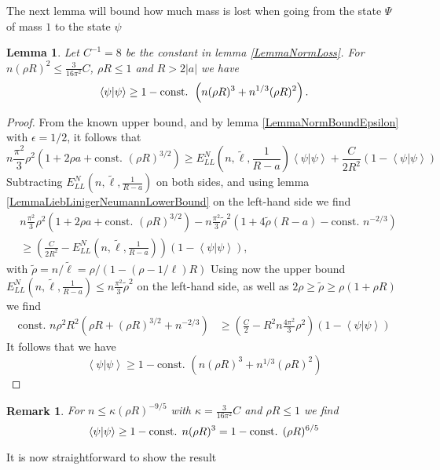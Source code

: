 \documentclass[a4paper,11pt]{article}
\newcommand{\abs}[1]{\left\lvert #1 \right\rvert}
\renewcommand{\braket}[1]{\left\langle#1\right\rangle}
\newtheorem{lemma}[theorem]{Lemma}
\newtheorem{remark}[theorem]{Remark}
\numberwithin{equation}{section}
\begin{document}
	
	The next lemma will bound how much mass is lost when going from the state $ \Psi $ of mass $ 1 $ to the state $ \psi $
	\begin{lemma}\label{LemmaImprovedMassBound}
		Let $ C^{-1}=8 $ be the constant in lemma \ref{LemmaNormLoss}. For $ n(\rho R)^2\leq  \frac{3}{16\pi^2}C $, $ \rho R\leq 1 $ and $ R>2\abs{a} $ we have
		\begin{equation}\label{EqImprovedMassBound}
		\begin{aligned}
		\braket{\psi|\psi} \geq 1-\textnormal{const. }\left(n(\rho R)^3+n^{1/3}(\rho R)^2\right).
		\end{aligned}
		\end{equation}
	\end{lemma}
	\begin{proof}
		From the known upper bound, and by lemma \ref{LemmaNormBoundEpsilon} with $ \epsilon=1/2 $, it follows that 
		\begin{equation}
		n\frac{\pi^2}{3}\rho^2\left(1+2\rho a+\text{const. }(\rho R)^{3/2}\right)\geq E_{LL}^N \left(n,\tilde{\ell},\frac{1}{R-a}\right)\braket{\psi|\psi}+ \frac{C}{2R^2}(1-\braket{\psi|\psi})
		\end{equation}
		Subtracting $ E_{LL}^N \left(n,\tilde{\ell},\frac{1}{R-a}\right) $ on both sides, and using lemma \ref{LemmaLiebLinigerNeumannLowerBound} on the left-hand side we find\begin{equation}
		\begin{aligned}
		&n\frac{\pi^2}{3}\rho^2\left(1+2\rho a+\text{const. }(\rho R)^{3/2}\right)-n\frac{\pi^2}{3}\tilde{\rho}^2\left(1+4\tilde{\rho} (R-a)-\text{const. }n^{-2/3}\right)\\
		&\geq  \left(\frac{C}{2R^2}-E_{LL}^N \left(n,\tilde{\ell},\frac{1}{R-a}\right)\right)(1-\braket{\psi|\psi}),
		\end{aligned}
		\end{equation}
		with $ \tilde{\rho}=n/\tilde{\ell}=\rho/(1-(\rho-1/\ell)R)  $
		Using now the upper bound $ E^N_{LL}\left(n,\tilde{\ell},\frac{1}{R-a}\right)\leq n\frac{\pi^2}{3}\tilde{\rho}^2 $ on the left-hand side, as well as $ 2\rho \geq\tilde{\rho}\geq \rho(1+\rho R)$ we find
		\begin{equation}
		\begin{aligned}
		\text{const. }n\rho^2R^2\left(\rho R+(\rho R)^{3/2}+n^{-2/3}\right)&\geq \left(\frac{C}{2}-R^2n\frac{4\pi^2}{3}\rho^2\right)\left(1-\braket{\psi|\psi}\right)
		\end{aligned}
		\end{equation}
		It follows that we have \begin{equation}
		\braket{\psi|\psi}\geq 1-\text{const. }\left(n(\rho R)^3+n^{1/3}(\rho R)^2\right)
		\end{equation}
	\end{proof}
	\begin{remark}
		For $ n\leq \kappa (\rho R)^{-9/5} $ with $ \kappa=\frac{3}{16\pi^2}C $ and $ \rho R\leq 1 $ we find \begin{equation}
		\braket{\psi|\psi}\geq 1-\textnormal{const. }n(\rho R)^3=1-\textnormal{const. }(\rho R)^{6/5}
		\end{equation}
	\end{remark}
	It is now straightforward to show the result
	
\end{document}
